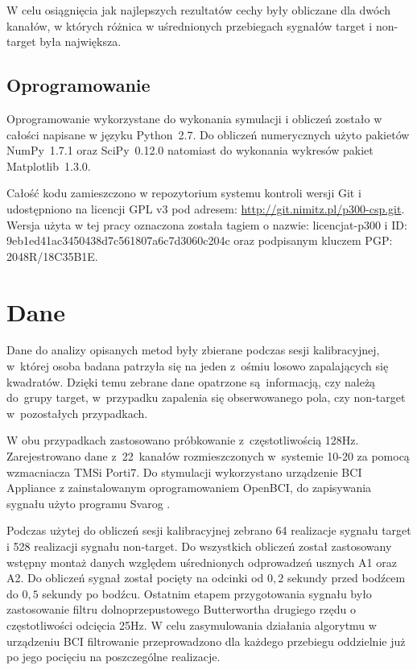 \documentclass[licencjacka,openright]{pracamgr}
\begin{document}
W celu osiągnięcia jak najlepszych rezultatów cechy były obliczane dla dwóch kanałów, w których różnica w uśrednionych przebiegach sygnałów target i non-target była największa.

\section{Oprogramowanie}
Oprogramowanie wykorzystane do wykonania symulacji i obliczeń zostało w całości napisane w języku Python~2{.}7. Do obliczeń numerycznych użyto pakietów NumPy~1{.}7{.}1 oraz SciPy~0{.}12{.}0 natomiast do wykonania wykresów pakiet Matplotlib~1{.}3{.}0.

Całość kodu zamieszczono w repozytorium systemu kontroli wersji Git i udostępniono na licencji GPL v3 pod adresem: \url{http://git.nimitz.pl/p300-csp.git}. Wersja użyta w tej pracy oznaczona została tagiem o nazwie: licencjat-p300 i ID: 9eb1ed41ac3450438d7c561807a6c7d3060c204c oraz podpisanym kluczem PGP: 2048R/18C35B1E.

\chapter{Dane}
Dane do analizy opisanych metod były zbierane podczas sesji kalibracyjnej, w~której osoba badana patrzyła się na jeden z~ośmiu losowo zapalających się kwadratów. Dzięki temu zebrane dane opatrzone są~informacją, czy należą do~grupy target, w~przypadku zapalenia się obserwowanego pola, czy non-target w~pozostałych przypadkach.

W obu przypadkach zastosowano próbkowanie z~częstotliwością 128Hz. Zarejestrowano dane z~22~kanałów rozmieszczonych w~systemie 10-20 za pomocą wzmacniacza TMSi Porti7. Do stymulacji wykorzystano urządzenie BCI Appliance z zainstalowanym oprogramowaniem OpenBCI, do zapisywania sygnału użyto programu Svarog \citep{obci}.

Podczas użytej do obliczeń sesji kalibracyjnej zebrano 64 realizacje sygnału target i 528 realizacji sygnału non-target. Do wszystkich obliczeń został zastosowany wstępny montaż danych względem uśrednionych odprowadzeń usznych A1 oraz A2. Do obliczeń sygnał został pocięty na odcinki od $0{,}2$ sekundy przed bodźcem do $0{,}5$ sekundy po bodźcu. Ostatnim etapem przygotowania sygnału było zastosowanie filtru dolnoprzepustowego Butterwortha drugiego rzędu o częstotliwości odcięcia 25Hz. W celu zasymulowania działania algorytmu w urządzeniu BCI filtrowanie przeprowadzono dla każdego przebiegu oddzielnie już po jego pocięciu na poszczególne realizacje.
\end{document}
